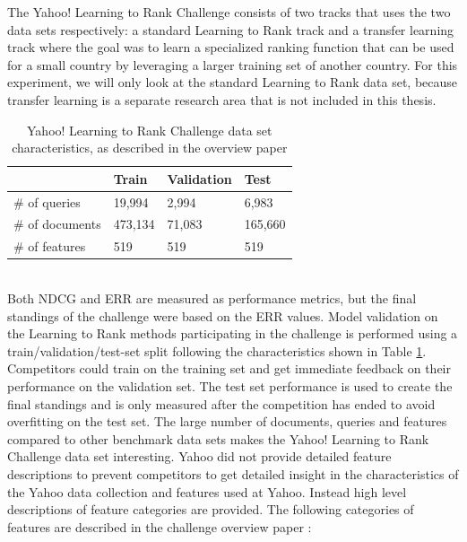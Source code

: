 The Yahoo! Learning to Rank Challenge consists of two tracks that uses the two data sets respectively: a standard Learning to Rank track and a transfer learning track where the goal was to learn a specialized ranking function that can be used for a small country by leveraging a larger training set of another country. For this experiment, we will only look at the standard Learning to Rank data set, because transfer learning is a separate research area that is not included in this thesis.\\
\begin{table}[!h]
\begin{tabular}{l|lll}
 & Train & Validation & Test \\ 
 \hline
\# of queries & 19,994 & 2,994 & 6,983 \\ 
\# of documents & 473,134 & 71,083 & 165,660 \\ 
\# of features & 519 & 519 & 519 \\ 
\end{tabular}
\caption{Yahoo! Learning to Rank Challenge data set characteristics, as described in the overview paper \cite{Chapelle2011a}}
\label{tab:yahoo_characteristics}
\end{table}\\
Both \ac{NDCG} and \ac{ERR} are measured as performance metrics, but the final standings of the challenge were based on the \ac{ERR} values. Model validation on the Learning to Rank methods participating in the challenge is performed using a train/validation/test-set split following the characteristics shown in Table \ref{tab:yahoo_characteristics}. Competitors could train on the training set and get immediate feedback on their performance on the validation set. The test set performance is used to create the final standings and is only measured after the competition has ended to avoid overfitting on the test set. The large number of documents, queries and features compared to other benchmark data sets makes the Yahoo! Learning to Rank Challenge data set interesting. Yahoo did not provide detailed feature descriptions to prevent competitors to get detailed insight in the characteristics of the Yahoo data collection and features used at Yahoo. Instead high level descriptions of feature categories are provided. The following categories of features are described in the challenge overview paper \cite{Chapelle2011a}:\\
